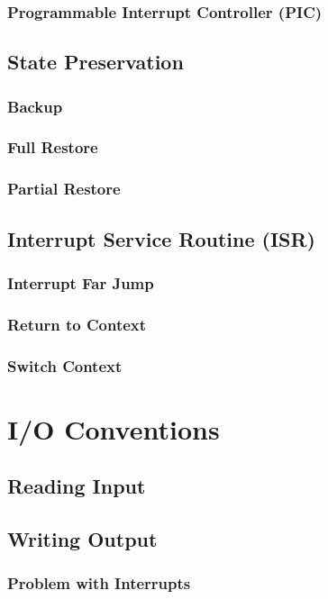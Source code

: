 \documentclass[oneside, a4paper]{memoir}
\begin{document}
\subsection{Programmable Interrupt Controller (PIC)}
\section{State Preservation}
\label{sec:State Preservation}
\subsection{Backup}
\subsection{Full Restore}
\subsection{Partial Restore}
\section{Interrupt Service Routine (ISR)}
\subsection{Interrupt Far Jump}
\subsection{Return to Context}
\subsection{Switch Context}

\chapter{I/O Conventions}
\label{ch:I/O Conventions}
\section{Reading Input}
\section{Writing Output}
\subsection{Problem with Interrupts}
\end{document}
